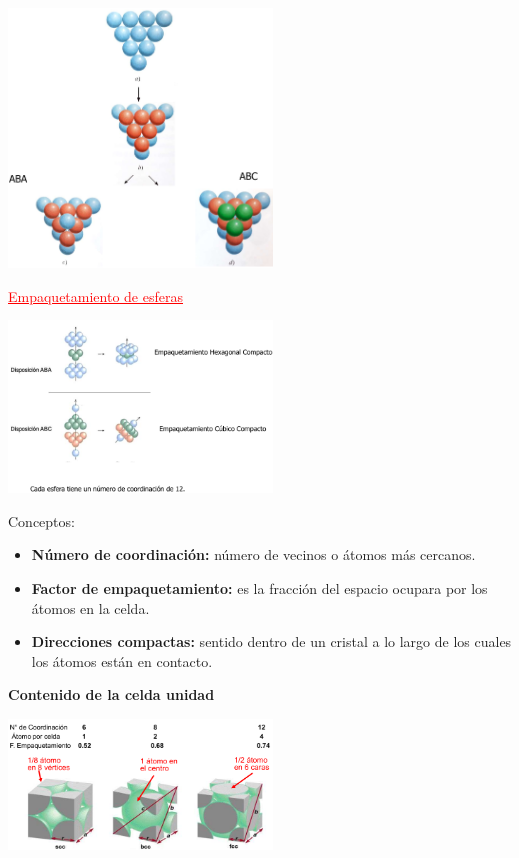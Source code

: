             \begin{center} \includegraphics[width=7cm]{./imagenes/empaquetamientoCompacto.png} \end{center}
            \begin{center} \textcolor{red}{\underline{Empaquetamiento de esferas}} \end{center}
            \begin{center} \includegraphics[width=7cm]{./imagenes/empaquetamientoDeEsferas.png} \end{center}
            \sangria{} Conceptos:
            \begin{itemize}
                \item \textbf{Número de coordinación:} número de vecinos o átomos más cercanos.
                \item \textbf{Factor de empaquetamiento:} es la fracción del espacio ocupara por los átomos en la celda.
                \item \textbf{Direcciones compactas:} sentido dentro de un cristal a lo largo de los cuales los átomos están en contacto.
            \end{itemize}
            \saltoPag{}
            \textbf{Contenido de la celda unidad}
            \begin{center} \includegraphics[width=7cm]{./imagenes/contenidoCeldaUnidad.png} \end{center}
